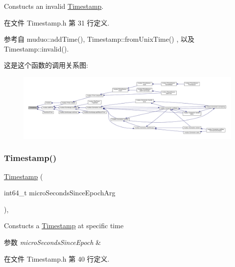 Constucts an invalid \hyperlink{classmuduo_1_1Timestamp}{Timestamp}. 

在文件 Timestamp.\+h 第 31 行定义.



参考自 muduo\+::add\+Time(), Timestamp\+::from\+Unix\+Time() , 以及 Timestamp\+::invalid().

这是这个函数的调用关系图\+:
\nopagebreak
\begin{figure}[H]
\begin{center}
\leavevmode
\includegraphics[width=350pt]{classmuduo_1_1Timestamp_a3ccb273b45fb16b1b14de8a4c8b44e3b_icgraph}
\end{center}
\end{figure}
\mbox{\label{classmuduo_1_1Timestamp_a37c7ad2d5316b1c9c0e6e1686ad599ff}} 
\subsubsection{\texorpdfstring{Timestamp()}{Timestamp()}\hspace{0.1cm}{\footnotesize\ttfamily [2/2]}}
{\footnotesize\ttfamily \hyperlink{classmuduo_1_1Timestamp}{Timestamp} (\begin{DoxyParamCaption}\item[{int64\+\_\+t}]{micro\+Seconds\+Since\+Epoch\+Arg }\end{DoxyParamCaption})\hspace{0.3cm}{\ttfamily [inline]}, {\ttfamily [explicit]}}

Constucts a \hyperlink{classmuduo_1_1Timestamp}{Timestamp} at specific time


\begin{DoxyParams}{参数}
{\em micro\+Seconds\+Since\+Epoch} & \\
\hline
\end{DoxyParams}


在文件 Timestamp.\+h 第 40 行定义.



